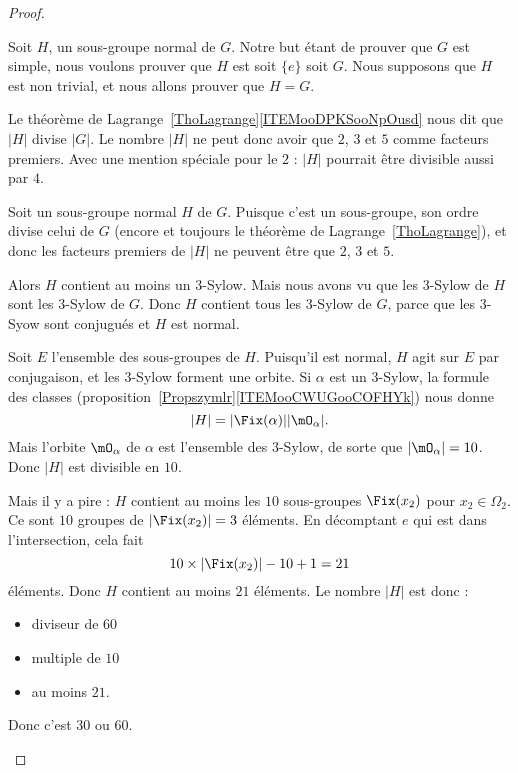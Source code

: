 \begin{proof}
\begin{subproof}
		Soit \( H\), un sous-groupe normal de \( G\). Notre but étant de prouver que \( G\) est simple, nous voulons prouver que \( H\) est soit \( \{ e \}\) soit \( G\). Nous supposons que \( H\) est non trivial, et nous allons prouver que \( H=G\).

		Le théorème de Lagrange~\ref{ThoLagrange}\ref{ITEMooDPKSooNpOusd} nous dit que \( | H |\) divise \( | G |\). Le nombre \( | H |\) ne peut donc avoir que \( 2\), \( 3\) et \( 5\) comme facteurs premiers. Avec une mention spéciale pour le \( 2\) : \( | H |\) pourrait être divisible aussi par \( 4\).

		\spitem[Diviseurs de \( | H |\)]

		Soit un sous-groupe normal \( H\) de \( G\). Puisque c'est un sous-groupe, son ordre divise celui de \( G\) (encore et toujours le théorème de Lagrange~\ref{ThoLagrange}), et donc les facteurs premiers de \( | H |\) ne peuvent être que \( 2\), \( 3\) et \( 5\).

		Alors \( H\) contient au moins un \( 3\)-Sylow. Mais nous avons vu que les \( 3\)-Sylow de \( H\) sont les \( 3\)-Sylow de \( G\). Donc \( H\) contient tous les \( 3\)-Sylow de \( G\), parce que les \( 3\)-Syow sont conjugués et \( H\) est normal.

		Soit \( E\) l'ensemble des sous-groupes de \( H\). Puisqu'il est normal, \( H\) agit sur \( E\) par conjugaison, et les \( 3\)-Sylow forment une orbite. Si \( \alpha\) est un \( 3\)-Sylow, la formule des classes (proposition~\ref{Propszymlr}\ref{ITEMooCWUGooCOFHYk}) nous donne
		\begin{equation}
			| H |=| \Fix(\alpha) | |\mO_{\alpha} |.
		\end{equation}
		Mais l'orbite \( \mO_{\alpha}\) de \( \alpha\) est l'ensemble des \( 3\)-Sylow, de sorte que \( | \mO_{\alpha} |=10\). Donc \( | H |\) est divisible en \( 10\).

		Mais il y a pire : \( H\) contient au moins les \( 10\) sous-groupes \( \Fix(x_2)\) pour \( x_2\in \Omega_2\). Ce sont \( 10\) groupes de \( | \Fix(x_2) |=3\) éléments. En décomptant \( e\) qui est dans l'intersection, cela fait
		\begin{equation}
			10\times | \Fix(x_2) |-10+1=21
		\end{equation}
		éléments. Donc \( H\) contient au moins \( 21\) éléments. Le nombre \( | H |\) est donc :
		\begin{itemize}
			\item diviseur de \( 60\)
			\item multiple de \( 10\)
			\item au moins \( 21\).
		\end{itemize}
		Donc c'est \( 30\) ou \( 60\).


\end{subproof}
\end{proof}
